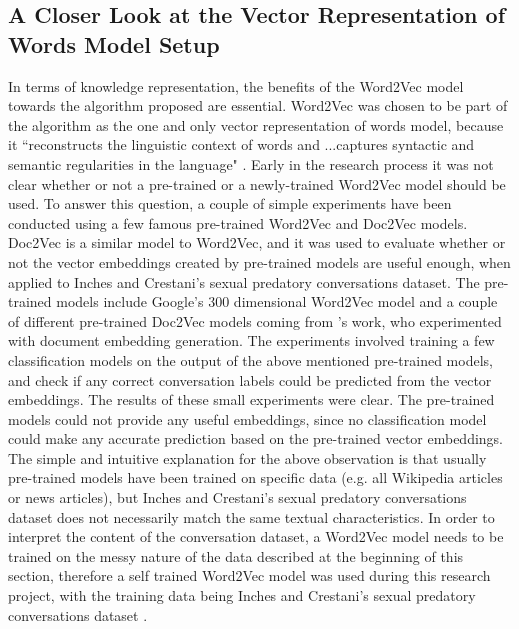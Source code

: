 \documentclass[11pt]{article}
\begin{document}
\subsection{A Closer Look at the Vector Representation of Words Model Setup}
In terms of knowledge representation, the benefits of the Word2Vec model towards the algorithm proposed are essential. Word2Vec was chosen to be part of the algorithm as the one and only vector representation of words model, because it ``reconstructs the linguistic context of words and ...captures syntactic and semantic regularities in the language" \cite{mikolov2013linguistic}. Early in the research process it was not clear whether or not a pre-trained or a newly-trained Word2Vec model should be used. To answer this question, a couple of simple experiments have been conducted using a few famous pre-trained Word2Vec and Doc2Vec \cite{le2014distributed} models. Doc2Vec is a similar model to Word2Vec, and it was used to evaluate whether or not the vector embeddings created by pre-trained models are useful enough, when applied to Inches and Crestani's sexual predatory conversations dataset. The pre-trained models include Google's 300 dimensional Word2Vec model \cite{MikolovChenCorradoDean2013a} and a couple of different pre-trained Doc2Vec models coming from \cite{lau2016empirical}'s work, who experimented with document embedding generation. The experiments involved training a few classification models on the output of the above mentioned pre-trained models, and check if any correct conversation labels could be predicted from the vector embeddings. The results of these small experiments were clear. The pre-trained models could not provide any useful embeddings, since no classification model could make any accurate prediction based on the pre-trained vector embeddings. The simple and intuitive explanation for the above observation is that usually pre-trained models have been trained on specific data (e.g. all Wikipedia articles or news articles), but Inches and Crestani's sexual predatory conversations dataset does not necessarily match the same textual characteristics. In order to interpret the content of the conversation dataset, a Word2Vec model needs to be trained on the messy nature of the data described at the beginning of this section, therefore a self trained Word2Vec model was used during this research project, with the training data being Inches and Crestani's sexual predatory conversations dataset \cite{inches2012overview}.
\end{document}
